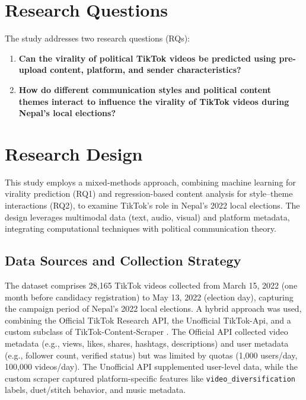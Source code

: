 \documentclass[12pt,a4paper]{report}
\begin{document}
\chapter{Research Questions}
\label{sec:research_questions}

The study addresses two research questions (RQs):

\begin{enumerate}[label=RQ\arabic*:, leftmargin=*]
    \item \textbf{Can the virality of political TikTok videos be predicted using pre-upload content, platform, and sender characteristics?}
    

    \item \textbf{How do different communication styles and political content themes interact to influence the virality of TikTok videos during Nepal’s local elections?}
    
\end{enumerate}

\chapter{Research Design}
This study employs a mixed-methods approach, combining machine learning for virality prediction (RQ1) and regression-based content analysis for style–theme interactions (RQ2), to examine TikTok’s role in Nepal’s 2022 local elections. The design leverages multimodal data (text, audio, visual) and platform metadata, integrating computational techniques with political communication theory.

\section{Data Sources and Collection Strategy}
The dataset comprises 28,165 TikTok videos collected from March 15, 2022 (one month before candidacy registration) to May 13, 2022 (election day), capturing the campaign period of Nepal’s 2022 local elections. A hybrid approach was used, combining the Official TikTok Research API, the Unofficial TikTok-Api, and a custom subclass of TikTok-Content-Scraper \parencite{QBukold2025TikTokScraper}. The Official API collected video metadata (e.g., views, likes, shares, hashtags, descriptions) and user metadata (e.g., follower count, verified status) but was limited by quotas (1,000 users/day, 100,000 videos/day). The Unofficial API supplemented user-level data, while the custom scraper captured platform-specific features like \texttt{video\_diversification} labels, duet/stitch behavior, and music metadata.
\end{document}

